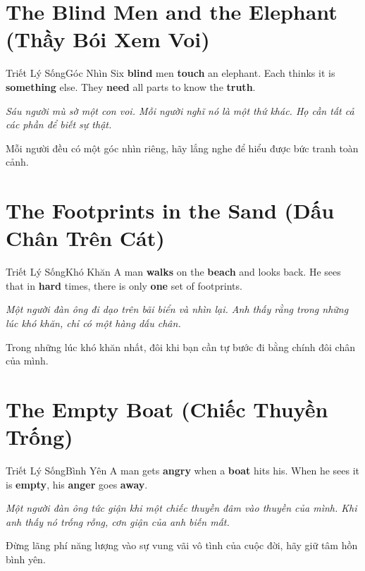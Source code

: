 \section{The Blind Men and the Elephant (Thầy Bói Xem Voi)}
\begin{truyen}{Triết Lý Sống}{Góc Nhìn}
Six \textbf{blind} men \textbf{touch} an elephant. Each thinks it is \textbf{something} else. They \textbf{need} all parts to know the \textbf{truth}.

\textit{Sáu người mù sờ một con voi. Mỗi người nghĩ nó là một thứ khác. Họ cần tất cả các phần để biết sự thật.}

\begin{baihoc}
Mỗi người đều có một góc nhìn riêng, hãy lắng nghe để hiểu được bức tranh toàn cảnh.
\end{baihoc}
\end{truyen}

\section{The Footprints in the Sand (Dấu Chân Trên Cát)}
\begin{truyen}{Triết Lý Sống}{Khó Khăn}
A man \textbf{walks} on the \textbf{beach} and looks back. He sees that in \textbf{hard} times, there is only \textbf{one} set of footprints.

\textit{Một người đàn ông đi dạo trên bãi biển và nhìn lại. Anh thấy rằng trong những lúc khó khăn, chỉ có một hàng dấu chân.}

\begin{baihoc}
Trong những lúc khó khăn nhất, đôi khi bạn cần tự bước đi bằng chính đôi chân của mình.
\end{baihoc}
\end{truyen}

\section{The Empty Boat (Chiếc Thuyền Trống)}
\begin{truyen}{Triết Lý Sống}{Bình Yên}
A man gets \textbf{angry} when a \textbf{boat} hits his. When he sees it is \textbf{empty}, his \textbf{anger} goes \textbf{away}.

\textit{Một người đàn ông tức giận khi một chiếc thuyền đâm vào thuyền của mình. Khi anh thấy nó trống rỗng, cơn giận của anh biến mất.}

\begin{baihoc}
Đừng lãng phí năng lượng vào sự vung vãi vô tình của cuộc đời, hãy giữ tâm hồn bình yên.
\end{baihoc}
\end{truyen}

